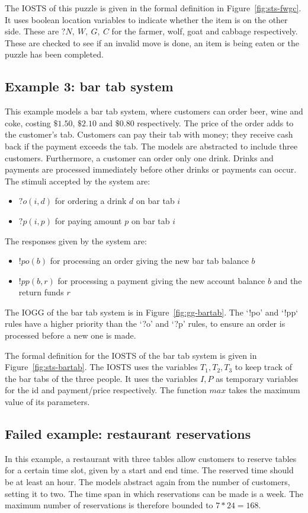 The IOSTS of this puzzle is given in the formal definition in Figure~\ref{fig:sts-fwgc}. It uses boolean location variables to indicate whether the item is on the other side. These are $?N,\:W,\:G,\:C$ for the farmer, wolf, goat and cabbage respectively. These are checked to see if an invalid move is done, an item is being eaten or the puzzle has been completed.

\subsection{Example 3: bar tab system}
This example models a bar tab system, where customers can order beer, wine and coke, costing $\$1.50$, $\$2.10$ and $\$0.80$ respectively. The price of the order adds to the customer's tab. Customers can pay their tab with money; they receive cash back if the payment exceeds the tab. The models are abstracted to include three customers. Furthermore, a customer can order only one drink. Drinks and payments are processed immediately before other drinks or payments can occur. The stimuli accepted by the system are:
\begin{itemize}
\item $?o(i,d)$ for ordering a drink $d$ on bar tab $i$
\item $?p(i,p)$ for paying amount $p$ on bar tab $i$
\end{itemize}
The responses given by the system are:
\begin{itemize}
\item $!po(b)$ for processing an order giving the new bar tab balance $b$
\item $!pp(b,r)$ for processing a payment giving the new account balance $b$ and the return funds $r$
\end{itemize}

The IOGG of the bar tab system is in Figure~\ref{fig:gg-bartab}. The `!po' and `!pp` rules have a higher priority than the `?o' and `?p' rules, to ensure an order is processed before a new one is made.

The formal definition for the IOSTS of the bar tab system is given in Figure~\ref{fig:sts-bartab}. The IOSTS uses the variables $T_1, T_2, T_3$ to keep track of the bar tabs of the three people. It uses the variables $I, P$ as temporary variables for the id and payment/price respectively. The function $max$ takes the maximum value of its parameters.

\subsection{Failed example: restaurant reservations}
In this example, a restaurant with three tables allow customers to reserve tables for a certain time slot, given by a start and end time. The reserved time should be at least an hour. The models abstract again from the number of customers, setting it to two. The time span in which reservations can be made is a week. The maximum number of reservations is therefore bounded to $7*24=168$.

